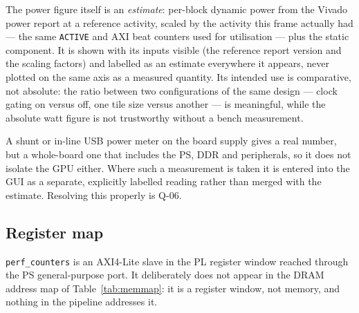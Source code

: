\documentclass[11pt,a4paper]{article}
\begin{document}
The power figure itself is an \emph{estimate}: per-block dynamic power from the
Vivado power report at a reference activity, scaled by the activity this frame
actually had --- the same \texttt{ACTIVE} and AXI beat counters used for
utilisation --- plus the static component. It is shown with its inputs visible
(the reference report version and the scaling factors) and labelled as an
estimate everywhere it appears, never plotted on the same axis as a measured
quantity. Its intended use is comparative, not absolute: the ratio between two
configurations of the same design --- clock gating on versus off, one tile size
versus another --- is meaningful, while the absolute watt figure is not
trustworthy without a bench measurement.

A shunt or in-line USB power meter on the board supply gives a real number, but
a whole-board one that includes the PS, DDR and peripherals, so it does not
isolate the GPU either. Where such a measurement is taken it is entered into the
GUI as a separate, explicitly labelled reading rather than merged with the
estimate. Resolving this properly is Q-06.

\subsection{Register map}

\texttt{perf\_counters} is an AXI4-Lite slave in the PL register window reached
through the PS general-purpose port. It deliberately does not appear in the DRAM
address map of Table~\ref{tab:memmap}: it is a register window, not memory, and
nothing in the pipeline addresses it.
\end{document}
